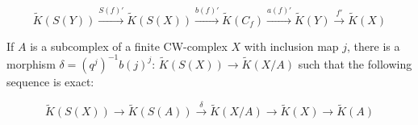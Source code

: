 $$\tilde{K}(S(Y)) \xrightarrow{S(f)'} \tilde{K}(S(X)) \xrightarrow{b(f)'} \tilde{K}(C_f) \xrightarrow{a(f)'} \tilde{K}(Y) \xrightarrow{f'} \tilde{K}(X)$$

If $A$ is a subcomplex of a finite CW-complex $X$ with inclusion map $j$, there is a morphism $\delta = (q^j)^{-1} b(j)^j$: $\tilde{K}(S(X)) \rightarrow \tilde{K}(X/A)$ such that the following sequence is exact:

$$\tilde{K}(S(X)) \rightarrow \tilde{K}(S(A)) \xrightarrow{\delta} \tilde{K}(X/A) \rightarrow \tilde{K}(X) \rightarrow \tilde{K}(A)$$
